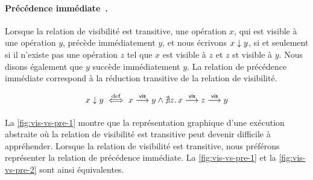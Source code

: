 \paragraph{Précédence immédiate~\autocite{hernandez2003immediate,hernandez2015minimal}.}
Lorsque la relation de visibilité est transitive, une opération $x$, qui est visible à une opération $y$, précède immédiatement $y$, et nous écrivons $x \downarrow y$, si et seulement si il n'existe pas une opération $z$ tel que $x$ est visible à $z$ et $z$ st visible à $y$.
Nous disons également que $y$ succède immédiatement $y$.
La relation de précédence immédiate correspond à la réduction transitive de la relation de visibilité.

\begin{equation*}
    x \downarrow y \overset{\mathrm{def}}{\iff} x \overset{\mathsf{vis}}{\longrightarrow} y \land \nexists z \ldotp x \overset{\mathsf{vis}}{\longrightarrow} z \overset{\mathsf{vis}}{\longrightarrow} y
\end{equation*}

\paragraph{} La \autoref{fig:vis-vs-pre-1} montre que la représentation graphique d'une exécution abstraite où la relation de visibilité est transitive peut devenir difficile à appréhender.
Lorsque la relation de visibilité est transitive, nous préférons représenter la relation de précédence immédiate.
La \autoref{fig:vis-vs-pre-1} et la \autoref{fig:vis-vs-pre-2} sont ainsi équivalentes.

